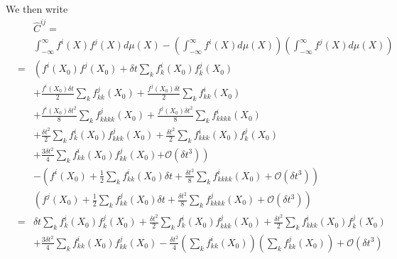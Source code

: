 \documentclass[12pt]{article}
\begin{document}
We then write
\begin{eqnarray}
&& \hat{C}^{ij} = \\ 
&& \int_{-\infty}^{\infty} f^i(X) f^j(X) d\mu(X) - \left(\int_{-\infty}^{\infty} f^i(X) d\mu(X) \right) \left(\int_{-\infty}^{\infty} f^j(X) d\mu(X) \right) \\
&=& \left( f^i(X_0) f^j(X_0) 
 + \delta t \sum_k f^i_k(X_0)  f^j_k(X_0) \right.   \\
&&  + \frac{f^i(X_0) \delta t}{2} \sum_{k} f^j_{kk}(X_0)
+ \frac{f^j(X_0) \delta t}{2} \sum_{k} f^i_{kk}(X_0)  \\
&&+ \frac{f^i(X_0) \delta t^2}{8} \sum_{k} f^j_{kkkk} (X_0) 
+ \frac{f^j(X_0) \delta t^2}{8} \sum_{k} f^i_{kkkk} (X_0)\\
&& + \frac{\delta t^2}{2} \sum_k f^i_k(X_0) f^j_{kkk} (X_0)  
 + \frac{\delta t^2}{2} \sum_k f^i_{kkk} (X_0) f^j_k(X_0) \\
&&+  \frac{3  \delta t^2}{4} \sum_{k} f^i_{kk}(X_0) f^j_{kk}(X_0) 
 \left.+ \mathcal{O}\left( \delta t^3 \right) \right) \\
&&- \left( f^i(X_0) + \frac{1}{2} \sum_k f^i_{kk}(X_0) \delta t + \frac{\delta t^2}{8} \sum_{k} f^i_{kkkk} (X_0) + \mathcal{O} (\delta t^3 ) \right) \\
&&\left( f^j(X_0) + \frac{1}{2} \sum_k f^j_{kk}(X_0) \delta t + \frac{\delta t^2}{8} \sum_{k} f^j_{kkkk} (X_0) + \mathcal{O} (\delta t^3 ) \right) \\
&=&
\delta t \sum_k f^i_k(X_0)  f^j_k(X_0) 
+ \frac{\delta t^2}{2} \sum_k f^i_k(X_0) f^j_{kkk} (X_0)  
 + \frac{\delta t^2}{2} \sum_k f^i_{kkk} (X_0) f^j_k(X_0) \\
&&+  \frac{3 \delta t^2}{4} \sum_{k} f^i_{kk}(X_0) f^j_{kk}(X_0) 
- \frac{\delta t^2}{4} \left( \sum_k f^i_{kk}(X_0) \right) \left( \sum_k f^j_{kk}(X_0) \right) 
 + \mathcal{O}\left( \delta t^3 \right) \\
\end{eqnarray}

\end{document}
